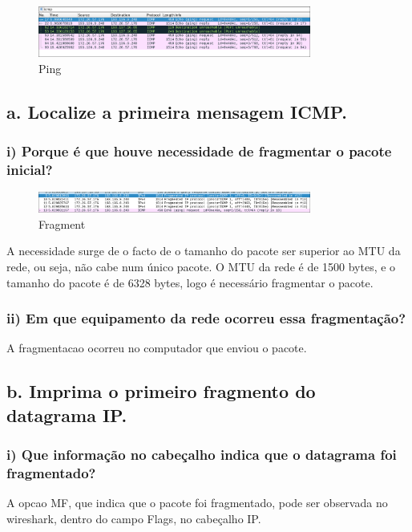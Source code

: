 \documentclass{article}
\begin{document}
\begin{figure}[h]
    \centering
    \includegraphics[width=0.8\textwidth]{images/ping.png}
    \caption{\label{fig:ping}Ping}
\end{figure}

\subsection*{a. Localize a primeira mensagem ICMP.}
\subsubsection*{i) Porque é que houve necessidade
de fragmentar o pacote inicial?}
\begin{figure}[h]
    \centering
    \includegraphics[width=0.8\textwidth]{images/fragment.png}
    \caption{\label{fig:fragment}Fragment}
\end{figure}

A necessidade surge de o facto de o tamanho do pacote ser superior ao MTU da rede, ou seja, não cabe num único pacote. O MTU da rede é de 1500 bytes, e o tamanho do pacote é de 6328 bytes, logo é necessário fragmentar o pacote.

\subsubsection*{ii) Em que equipamento da rede ocorreu
essa fragmentação?}

A fragmentacao ocorreu no computador que enviou o pacote. 

\subsection*{b. Imprima o primeiro fragmento do datagrama IP.}
\subsubsection*{i) Que informação no
cabeçalho indica que o datagrama foi fragmentado?}

A opcao MF, que indica que o pacote foi fragmentado, pode ser observada no wireshark, dentro do campo Flags, no cabeçalho IP.
\end{document}
